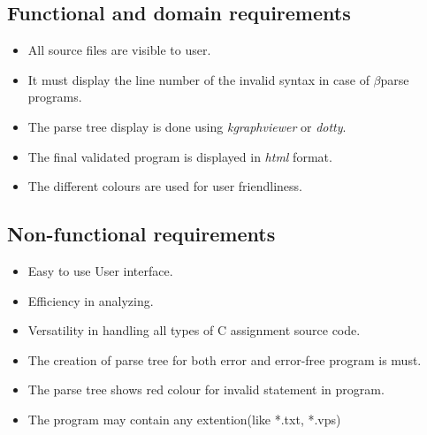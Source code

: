 \documentclass[12pt, oneside, a4paper]{article}
\begin{document}
\subsection
{Functional and domain requirements}
\begin{itemize}
\item All source files are visible to user.
\item It must display the line number of the invalid syntax in case of $\beta$parse programs.
\item The parse tree display is done using \emph{kgraphviewer} or \emph{dotty}.
\item The final validated program is displayed in \emph{html} format.
\item The different colours are used for user friendliness.
\end{itemize}
\subsection
{Non-functional requirements}
\begin{itemize}
\item Easy to use User interface.
\item Efficiency in analyzing.
\item Versatility in handling all types of C assignment source code.
\item The creation of parse tree for both error and error-free program is must.
\item The parse tree shows red colour for invalid statement in program.
\item The program may contain any extention(like *.txt, *.vps)
\end{itemize}
\end{document}
